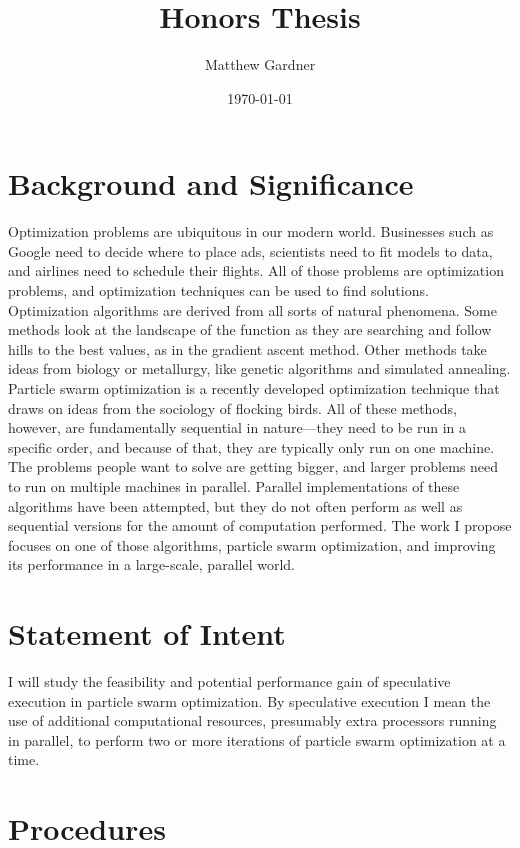 \documentclass[onecolumn, 12pt]{article}
\title{Honors Thesis}
\author{Matthew Gardner}
\date{\today}
\begin{document}
\maketitle

\section{Background and Significance}

Optimization problems are ubiquitous in our modern world.  Businesses such as
Google need to decide where to place ads, scientists need to fit models to
data, and airlines need to schedule their flights.  All of those problems are
optimization problems, and optimization techniques can be used to find
solutions.  Optimization algorithms are derived from all sorts of natural
phenomena.  Some methods look at the landscape of the function as they are
searching and follow hills to the best values, as in the gradient ascent
method.  Other methods take ideas from biology or metallurgy, like genetic
algorithms and simulated annealing.  Particle swarm optimization is a recently
developed optimization technique that draws on ideas from the sociology of
flocking birds.  All of these methods, however, are fundamentally sequential in
nature---they need to be run in a specific order, and because of that, they are
typically only run on one machine.  The problems people want to solve are
getting bigger, and larger problems need to run on multiple machines in
parallel.  Parallel implementations of these algorithms have been attempted,
but they do not often perform as well as sequential versions for the amount of
computation performed.  The work I propose focuses on one of those algorithms,
particle swarm optimization, and improving its performance in a large-scale,
parallel world.

\section{Statement of Intent}

I will study the feasibility and potential performance gain of speculative
execution in particle swarm optimization.  By speculative execution I mean the
use of additional computational resources, presumably extra processors running
in parallel, to perform two or more iterations of particle swarm optimization
at a time.

\section{Procedures}
\end{document}
